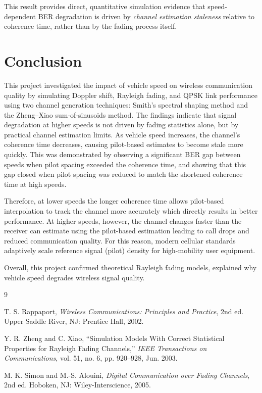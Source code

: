 \documentclass[12pt]{article}
\begin{document}
This result provides direct, quantitative simulation evidence
that speed-dependent BER degradation is driven by
\emph{channel estimation staleness} relative to coherence time,
rather than by the fading process itself.

\section{Conclusion}
This project investigated the impact of vehicle speed on wireless communication 
quality by simulating Doppler shift, Rayleigh fading, and QPSK link performance 
using two channel generation techniques: Smith’s spectral shaping method and the 
Zheng–Xiao sum-of-sinusoids method. The findings indicate that signal degradation 
at higher speeds is not driven by fading statistics alone, but by practical 
channel estimation limits. As vehicle speed increases, the channel's coherence 
time decreases, causing pilot-based estimates to become stale more quickly. 
This was demonstrated by observing a significant BER gap between speeds when 
pilot spacing exceeded the coherence time, and showing that this gap closed when 
pilot spacing was reduced to match the shortened coherence time at high speeds.

Therefore, at lower speeds the longer coherence time allows pilot-based 
interpolation to track the channel more accurately which directly results in
better performance. At higher speeds, however, the channel changes faster than 
the receiver can estimate using the pilot-based estimation leading to call drops 
and reduced communication quality. For this reason, modern cellular standards 
adaptively scale reference signal (pilot) density for high-mobility 
user equipment.

Overall, this project confirmed theoretical Rayleigh fading models, 
explained why vehicle speed degrades wireless signal quality.


\begin{thebibliography}{9}

T. S. Rappaport,
\textit{Wireless Communications: Principles and Practice},
2nd ed. Upper Saddle River, NJ: Prentice Hall, 2002.

Y. R. Zheng and C. Xiao,
``Simulation Models With Correct Statistical Properties for
Rayleigh Fading Channels,''
\textit{IEEE Transactions on Communications}, vol. 51, no. 6,
pp. 920--928, Jun. 2003.

M. K. Simon and M.-S. Alouini,
\textit{Digital Communication over Fading Channels},
2nd ed. Hoboken, NJ: Wiley-Interscience, 2005.

\end{thebibliography}
\end{document}
